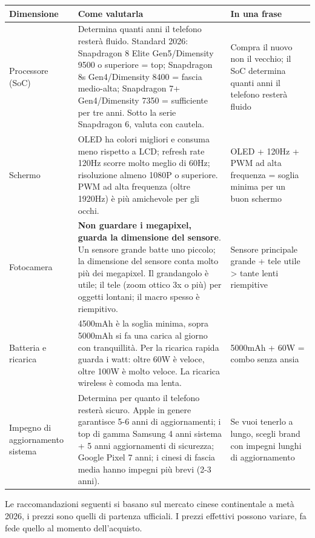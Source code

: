 \begin{center}
\begin{tabularx}{\linewidth}{|X|X|X|}
\hline
\textbf{Dimensione} & \textbf{Come valutarla} & \textbf{In una frase} \tabularnewline
\hline
Processore (SoC) & Determina quanti anni il telefono resterà fluido. Standard 2026: Snapdragon 8 Elite Gen5/Dimensity 9500 o superiore = top; Snapdragon 8s Gen4/Dimensity 8400 = fascia medio-alta; Snapdragon 7+ Gen4/Dimensity 7350 = sufficiente per tre anni. Sotto la serie Snapdragon 6, valuta con cautela. & Compra il nuovo non il vecchio; il SoC determina quanti anni il telefono resterà fluido \tabularnewline
Schermo & OLED ha colori migliori e consuma meno rispetto a LCD; refresh rate 120Hz scorre molto meglio di 60Hz; risoluzione almeno 1080P o superiore. PWM ad alta frequenza (oltre 1920Hz) è più amichevole per gli occhi. & OLED + 120Hz + PWM ad alta frequenza = soglia minima per un buon schermo \tabularnewline
Fotocamera & \textbf{Non guardare i megapixel, guarda la dimensione del sensore}. Un sensore grande batte uno piccolo; la dimensione del sensore conta molto più dei megapixel. Il grandangolo è utile; il tele (zoom ottico 3x o più) per oggetti lontani; il macro spesso è riempitivo. & Sensore principale grande + tele utile > tante lenti riempitive \tabularnewline
Batteria e ricarica & 4500mAh è la soglia minima, sopra 5000mAh si fa una carica al giorno con tranquillità. Per la ricarica rapida guarda i watt: oltre 60W è veloce, oltre 100W è molto veloce. La ricarica wireless è comoda ma lenta. & 5000mAh + 60W = combo senza ansia \tabularnewline
Impegno di aggiornamento sistema & Determina per quanto il telefono resterà sicuro. Apple in genere garantisce 5-6 anni di aggiornamenti; i top di gamma Samsung 4 anni sistema + 5 anni aggiornamenti di sicurezza; Google Pixel 7 anni; i cinesi di fascia media hanno impegni più brevi (2-3 anni). & Se vuoi tenerlo a lungo, scegli brand con impegni lunghi di aggiornamento \tabularnewline
\hline
\end{tabularx}
\end{center}


Le raccomandazioni seguenti si basano sul mercato cinese continentale a metà 2026, i prezzi sono quelli di partenza ufficiali. I prezzi effettivi possono variare, fa fede quello al momento dell'acquisto.


